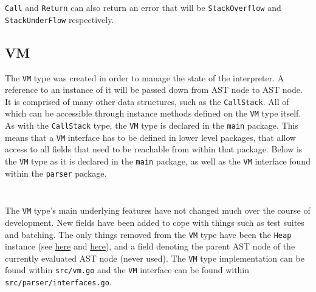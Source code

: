 \inputminted[firstline=140, lastline=151, autogobble, breaklines, tabsize=4]{go}{../../src/call.go}

\verb|Call| and \verb|Return| can also return an error that will be \verb|StackOverflow| and \verb|StackUnderFlow| respectively.

\subsection{VM}
\label{sec:data-structures-vm}

The \verb|VM| type was created in order to manage the state of the interpreter. A reference to an instance of it will be passed down from AST node to AST node. It is comprised of many other data structures, such as the \verb|CallStack|. All of which can be accessible through instance methods defined on the \verb|VM| type itself. As with the \verb|CallStack| type, the \verb|VM| type is declared in the \verb|main| package. This means that a \verb|VM| interface has to be defined in lower level packages, that allow access to all fields that need to be reachable from within that package. Below is the \verb|VM| type as it is declared in the \verb|main| package, as well as the \verb|VM| interface found within the \verb|parser| package.

\inputminted[firstline=15, lastline=40, autogobble, breaklines, tabsize=4]{go}{../../src/vm.go}

\inputminted[firstline=18, lastline=62, autogobble, breaklines, tabsize=4]{go}{../../src/parser/interfaces.go}



The \verb|VM| type's main underlying features have not changed much over the course of development. New fields have been added to cope with things such as test suites and batching. The only things removed from the \verb|VM| type have been the \verb|Heap| instance (see \hyperref[sec:data-structures-frames-callstack]{here} and \hyperref[sec:data-structures-heap]{here}), and a field denoting the parent AST node of the currently evaluated AST node (never used). The \verb|VM| type implementation can be found within \verb|src/vm.go| and the \verb|VM| interface can be found within \verb|src/parser/interfaces.go|.
